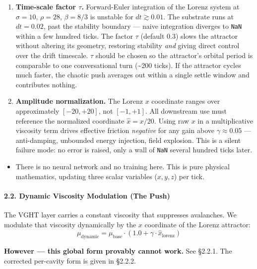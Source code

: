 \documentclass[
  11pt,
  a4paper,
]{article}
\providecommand{\tightlist}{%
  \setlength{\itemsep}{0pt}\setlength{\parskip}{0pt}}
\begin{document}
\begin{enumerate}
\def\labelenumi{\arabic{enumi}.}
\item
  \textbf{Time-scale factor \(\tau\).} Forward-Euler integration of the
  Lorenz system at \(\sigma = 10\), \(\rho = 28\), \(\beta = 8/3\) is
  unstable for \(dt \gtrsim 0.01\). The substrate runs at \(dt = 0.02\),
  past the stability boundary --- naive integration diverges to
  \texttt{NaN} within a few hundred ticks. The factor \(\tau\) (default
  \(0.3\)) slows the attractor without altering its geometry, restoring
  stability \emph{and} giving direct control over the drift timescale.
  \(\tau\) should be chosen so the attractor's orbital period is
  comparable to one conversational turn (\textasciitilde200 ticks). If
  the attractor cycles much faster, the chaotic push averages out within
  a single settle window and contributes nothing.
\item
  \textbf{Amplitude normalization.} The Lorenz \(x\) coordinate ranges
  over approximately \([-20, +20]\), not \([-1, +1]\). All downstream
  use must reference the normalized coordinate \(\hat{x} = x / 20\).
  Using raw \(x\) in a multiplicative viscosity term drives effective
  friction \emph{negative} for any gain above \(\gamma \approx 0.05\)
  --- anti-damping, unbounded energy injection, field explosion. This is
  a silent failure mode: no error is raised, only a wall of \texttt{NaN}
  several hundred ticks later.
\end{enumerate}

\begin{itemize}
\tightlist
\item
  There is no neural network and no training here. This is pure physical
  mathematics, updating three scalar variables (\(x, y, z\)) per tick.
\end{itemize}

\paragraph{2.2. Dynamic Viscosity Modulation (The
Push)}\label{dynamic-viscosity-modulation-the-push}

The VGHT layer carries a constant viscosity that suppresses avalanches.
We modulate that viscosity dynamically by the \(x\) coordinate of the
Lorenz attractor:
\[ \mu_{\text{dynamic}} = \mu_{\text{base}} \cdot (1.0 + \gamma \cdot \hat{x}_{\text{lorenz}}) \]

\textbf{However --- this global form provably cannot work.} See §2.2.1.
The corrected per-cavity form is given in §2.2.2.
\end{document}
